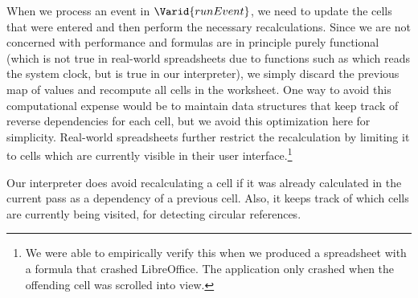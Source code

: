 When we process an event in \ensuremath{\Varid{runEvent}}, we need to update the cells that were
entered and then perform the necessary recalculations. Since we are not
concerned with performance and formulas are in principle purely functional
(which is not true in real-world spreadsheets due to functions such as 
which reads the system clock, but is true in our interpreter), we simply
discard the previous map of values and recompute all cells in the worksheet.
One way to avoid this computational expense would be to maintain data
structures that keep track of reverse dependencies for each cell, but we avoid
this optimization here for simplicity. Real-world spreadsheets further
restrict the recalculation by limiting it to cells which are currently visible
in their user interface.\footnote{We were able to empirically verify this when
we produced a spreadsheet with a formula that crashed LibreOffice. The
application only crashed when the offending cell was scrolled into view.}

Our interpreter does avoid recalculating a cell if it was already calculated
in the current pass as a dependency of a previous cell. Also, it keeps track
of which cells are currently being visited, for detecting circular references.

